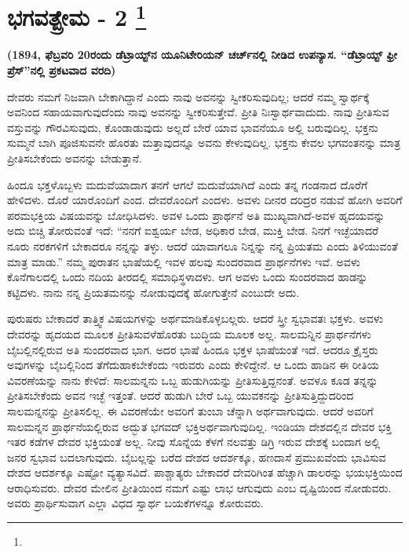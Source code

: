 
\chapter[ಭಗವತ್ಪ್ರೇಮ -೨ ]{ಭಗವತ್ಪ್ರೇಮ - 2 \protect\footnote{}}

\begin{center}
\textbf{(1894, ಫೆಬ್ರವರಿ 20ರಂದು ಡೆಟ್ರಾಯ್ಟ್​ನ ಯೂನಿಟೇರಿಯನ್​ ಚರ್ಚ್​ನಲ್ಲಿ ನೀಡಿದ ಉಪನ್ಯಾಸ. “ಡೆಟ್ರಾಯ್ಟ್​ ಫ್ರೀ ಪ್ರೆಸ್​”ನಲ್ಲಿ ಪ್ರಕಟವಾದ ವರದಿ)}
\end{center}

ದೇವರು ನಮಗೆ ನಿಜವಾಗಿ ಬೇಕಾಗಿದ್ದಾನೆ ಎಂದು ನಾವು ಅವನನ್ನು ಸ್ವೀಕರಿಸುವುದಿಲ್ಲ; ಆದರೆ ನಮ್ಮ ಸ್ವಾರ್ಥಕ್ಕೆ ಅವನಿಂದ ಸಹಾಯವಾಗುವುದೆಂದು ನಾವು ಅವನನ್ನು ಸ್ವೀಕರಿಸುತ್ತೇವೆ. ಪ್ರೀತಿ ನಿಃಸ್ವಾರ್ಥವಾದುದು. ನಾವು ಪ್ರೀತಿಸುವ ವಸ್ತುವನ್ನು ಗೌರವಿಸುವುದು, ಕೊಂಡಾಡುವುದು ಅಲ್ಲದೆ ಬೇರೆ ಯಾವ ಭಾವನೆಯೂ ಅಲ್ಲಿ ಬರುವುದಿಲ್ಲ. ಭಕ್ತನು ಸುಮ್ಮನೆ ಬಾಗಿ ಪೂಜಿಸುವನೇ ಹೊರತು ಮತ್ತಾವುದನ್ನೂ ಅವನು ಕೇಳುವುದಿಲ್ಲ. ಭಕ್ತನು ಕೇವಲ ಭಗವಂತನನ್ನು ಮಾತ್ರ ಪ್ರೀತಿಸಬೇಕೆಂದು ಅವನನ್ನು ಬೇಡುತ್ತಾನೆ.

ಹಿಂದೂ ಭಕ್ತಳೊಬ್ಬಳು ಮದುವೆಯಾದಾಗ ತನಗೆ ಆಗಲೆ ಮದುವೆಯಾಗಿದೆ ಎಂದು ತನ್ನ ಗಂಡನಾದ ದೊರೆಗೆ ಹೇಳಿದಳು. ದೊರೆ ಯಾರೊಂದಿಗೆ ಎಂದ. ದೇವರೊಂದಿಗೆ ಎಂದಳು. ಅವಳು ದೀನರ ದರಿದ್ರರ ನಡುವೆ ಹೋಗಿ ಅವರಿಗೆ ಪರಮಭಕ್ತಿಯ ವಿಷಯವನ್ನು ಬೋಧಿಸಿದಳು. ಅವಳ ಒಂದು ಪ್ರಾರ್ಥನೆ ಅತಿ ಮುಖ್ಯವಾಗಿದೆ-ಅವಳ ಹೃದಯವನ್ನು ಅದು ಬಿಚ್ಚಿ ತೋರುವಂತೆ ಇದೆ: “ನನಗೆ ಐಶ್ವರ್ಯ ಬೇಡ, ಅಧಿಕಾರ ಬೇಡ, ಮುಕ್ತಿ ಬೇಡ. ನಿನಗೆ ಇಚ್ಛೆಯಾದರೆ ನೂರು ನರಕಗಳಿಗೆ ಬೇಕಾದರೂ ನನ್ನನ್ನು ತಳ್ಳು. ಆದರೆ ಯಾವಾಗಲೂ ನಿನ್ನನ್ನು ನನ್ನ ಪ್ರಿಯತಮ ಎಂದು ತಿಳಿಯುವಂತೆ ಮಾತ್ರ ಮಾಡು.” ನಮ್ಮ ಪುರಾತನ ಭಾಷೆಯಲ್ಲಿ ಇವಳ ಹಲವು ಸುಂದರವಾದ ಪ್ರಾರ್ಥನೆಗಳು ಇವೆ. ಅವಳು ಕೊನೆಗಾಲದಲ್ಲಿ ಒಂದು ನದಿಯ ತೀರದಲ್ಲಿ ಸಮಾಧಿಸ್ಥಳಾದಳು. ಆಗ ಅವಳು ಒಂದು ಸುಂದರವಾದ ಹಾಡನ್ನು ಕಟ್ಟಿದಳು. ನಾನು ನನ್ನ ಪ್ರಿಯತಮನನ್ನು ನೋಡುವುದಕ್ಕೆ ಹೋಗುತ್ತೇನೆ ಎಂಬುದೇ ಅದು.

ಪುರುಷರು ಬೇಕಾದರೆ ತಾತ್ತ್ವಿಕ ವಿಷಯಗಳನ್ನು ಅರ್ಥಮಾಡಿಕೊಳ್ಳಬಲ್ಲರು. ಆದರೆ ಸ್ತ್ರೀ ಸ್ವಭಾವತಃ ಭಕ್ತಳು. ಅವಳು ದೇವರನ್ನು ಹೃದಯದ ಮೂಲಕ ಪ್ರೀತಿಸುವಳೆ\break ಹೊರತು ಬುದ್ಧಿಯ ಮೂಲಕ ಅಲ್ಲ. ಸಾಲಮನ್ನಿನ ಪ್ರಾರ್ಥನೆಗಳು ಬೈಬಲ್ಲಿನಲ್ಲಿರುವ ಅತಿ ಸುಂದರವಾದ ಭಾಗ. ಅದರ ಭಾಷೆ ಹಿಂದೂ ಭಕ್ತಳ ಭಾಷೆಯಂತೆ ಇದೆ. ಆದರೂ ಕ್ರೈಸ್ತರು ಅವುಗಳನ್ನು ಬೈಬಲ್ಲಿನಿಂದ ತೆಗೆದುಹಾಕಬೇಕೆಂದು ಇರುವರು ಎಂದು ಕೇಳಿದ್ದೇನೆ. ಆ ಒಂದು ಹಾಡಿನ ಈ ರೀತಿಯ ವಿವರಣೆಯನ್ನು ನಾನು ಕೇಳಿದೆ: ಸಾಲಮನ್ನನು ಒಬ್ಬ ಹುಡುಗಿಯನ್ನು ಪ್ರೀತಿಸುತ್ತಿದ್ದನಂತೆ. ಅವಳೂ ಕೂಡ ತನ್ನನ್ನು ಪ್ರೀತಿಸಬೇಕೆಂದು ಅವನ ಇಚ್ಛೆ ಇತ್ತಂತೆ. ಆದರೆ ಹುಡುಗಿ ಬೇರೆ ಒಬ್ಬ ಯುವಕನನ್ನು ಪ್ರೀತಿಸುತ್ತಿದ್ದುದರಿಂದ ಸಾಲಮನ್ನನನ್ನು ಪ್ರೀತಿಸಲಿಲ್ಲ. ಈ ವಿವರಣೆಯೇ ಅವರಿಗೆ ತುಂಬಾ ಚೆನ್ನಾಗಿ ಅರ್ಥವಾಗುವುದು. ಆದರೆ ಅವರಿಗೆ ಸಾಲಮನ್ನನ ಪ್ರಾರ್ಥನೆಯಲ್ಲಿರುವ ಅದ್ಭುತ ಭಗವದ್​ ಭಕ್ತಿ\break ಅರ್ಥವಾಗುವುದಿಲ್ಲ. ಇಂಡಿಯಾ ದೇಶದಲ್ಲಿನ ದೇವರ ಭಕ್ತಿ ಇತರ ಕಡೆಗಳ ದೇವರ ಭಕ್ತಿಯಂತೆ ಅಲ್ಲ. ನೀವು ಸೊನ್ನೆಯ ಕೆಳಗೆ ನಲವತ್ತು ಡಿಗ್ರಿ ಇರುವ ದೇಶಕ್ಕೆ ಬಂದಾಗ ಅಲ್ಲಿ ಜನರ ಸ್ವಭಾವ ಬದಲಾಗುವುದು. ಬೈಬಲ್ಲನ್ನು ಬರೆದ ದೇಶದ ಆದರ್ಶಕ್ಕೂ, ಹಣದಾಸೆ ಪ್ರಮುಖವೆಂದು ಭಾವಿಸುವ ದೇಶದ ಆದರ್ಶಕ್ಕೂ ಎಷ್ಟೋ ವ್ಯತ್ಯಾಸವಿದೆ. ಪಾಶ್ಚಾತ್ಯರು ಬೇಕಾದರೆ ದೇವರಿಗಿಂತ ಹೆಚ್ಚಾಗಿ ಡಾಲರನ್ನು ಭಯಭಕ್ತಿಯಿಂದ ಆರಾಧಿಸುವರು. ದೇವರ ಮೇಲಿನ ಪ್ರೀತಿಯಿಂದ ನಮಗೆ ಎಷ್ಟು ಲಾಭ ಆಗುವುದು ಎಂಬ ದೃಷ್ಟಿಯಿಂದ ನೋಡುವರು. ಅವರು ಪ್ರಾರ್ಥಿಸುವಾಗ ಎಲ್ಲಾ ವಿಧದ ಸ್ವಾರ್ಥ ಬಯಕೆಗಳನ್ನೂ ಕೋರುವರು.

